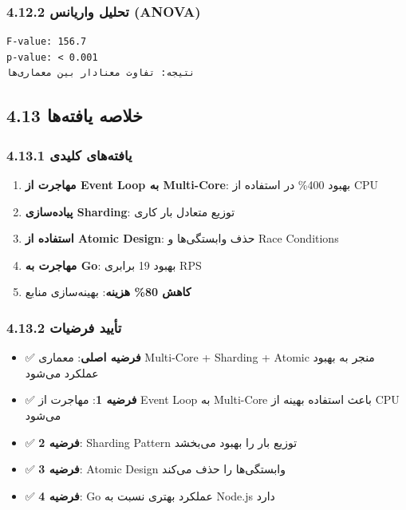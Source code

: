 \documentclass[
]{article}
\providecommand{\tightlist}{%
  \setlength{\itemsep}{0pt}\setlength{\parskip}{0pt}}
\begin{document}
\subsubsection{4.12.2 تحلیل واریانس
(ANOVA)}\label{ux62aux62dux644ux6ccux644-ux648ux627ux631ux6ccux627ux646ux633-anova}

\begin{verbatim}
F-value: 156.7
p-value: < 0.001
نتیجه: تفاوت معنادار بین معماری‌ها
\end{verbatim}

\subsection{4.13 خلاصه
یافته‌ها}\label{ux62eux644ux627ux635ux647-ux6ccux627ux641ux62aux647ux647ux627}

\subsubsection{4.13.1 یافته‌های
کلیدی}\label{ux6ccux627ux641ux62aux647ux647ux627ux6cc-ux6a9ux644ux6ccux62fux6cc}

\begin{enumerate}
\def\labelenumi{\arabic{enumi}.}
\tightlist
\item
  \textbf{مهاجرت از Event Loop به Multi-Core}: بهبود 400\% در استفاده از
  CPU
\item
  \textbf{پیاده‌سازی Sharding}: توزیع متعادل بار کاری
\item
  \textbf{استفاده از Atomic Design}: حذف وابستگی‌ها و Race Conditions
\item
  \textbf{مهاجرت به Go}: بهبود 19 برابری RPS
\item
  \textbf{کاهش 80\% هزینه}: بهینه‌سازی منابع
\end{enumerate}

\subsubsection{4.13.2 تأیید
فرضیات}\label{ux62aux623ux6ccux6ccux62f-ux641ux631ux636ux6ccux627ux62a}

\begin{itemize}
\tightlist
\item
  ✅ \textbf{فرضیه اصلی}: معماری Multi-Core + Sharding + Atomic منجر به
  بهبود عملکرد می‌شود
\item
  ✅ \textbf{فرضیه 1}: مهاجرت از Event Loop به Multi-Core باعث استفاده
  بهینه از CPU می‌شود
\item
  ✅ \textbf{فرضیه 2}: Sharding Pattern توزیع بار را بهبود می‌بخشد
\item
  ✅ \textbf{فرضیه 3}: Atomic Design وابستگی‌ها را حذف می‌کند
\item
  ✅ \textbf{فرضیه 4}: Go عملکرد بهتری نسبت به Node.js دارد
\end{itemize}
\end{document}
